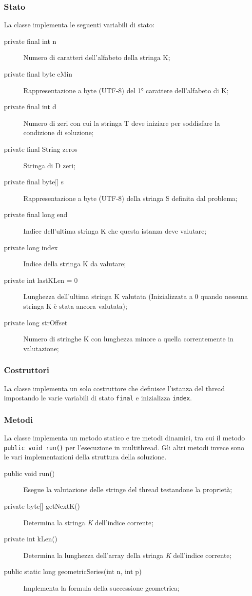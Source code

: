 \documentclass{article}
\begin{document}
   \subsubsection{Stato}
   La classe implementa le seguenti variabili di stato:
   \begin{description}
      \item[private final int n] Numero di caratteri dell'alfabeto della stringa K;
      \item[private final byte cMin] Rappresentazione a byte (UTF-8) del 1° carattere dell'alfabeto di K;
      \item[private final int d] Numero di zeri con cui la stringa T deve iniziare per soddisfare la condizione di soluzione;
      \item[private final String zeros] Stringa di D zeri;
      \item[{private final byte[] s}] Rappresentazione a byte (UTF-8) della stringa S definita dal problema;
      \item[private final long end] Indice dell'ultima stringa K che questa istanza deve valutare;
      \item[private long index] Indice della stringa K da valutare;
      \item[private int lastKLen = 0] Lunghezza dell'ultima stringa K valutata (Inizializzata a 0 quando nessuna stringa K è stata ancora valutata);
      \item[private long strOffset] Numero di stringhe K con lunghezza minore a quella correntemente in valutazione;
   \end{description}

   \subsubsection{Costruttori}
   La classe implementa un solo costruttore che definisce l'istanza del thread impostando le varie variabili di stato \verb|final| e inizializza \verb|index|.
   \newpage %

   \subsubsection{Metodi}
   La classe implementa un metodo statico e tre metodi dinamici, tra cui il metodo \verb|public void run()| per l'esecuzione in multithread. Gli altri metodi invece sono le vari implementazioni della struttura della soluzione.
   \begin{description}
      \item[public void run()] Esegue la valutazione delle stringe del thread testandone la proprietà;
      \item[{private byte[] getNextK()}] Determina la stringa \textit{K} dell'indice corrente;
      \item[private int kLen()] Determina la lunghezza dell'array della stringa \textit{K} dell'indice corrente;
      \item[public static long geometricSeries(int n, int p)] Implementa la formula della successione geometrica;
   \end{description}
\end{document}
